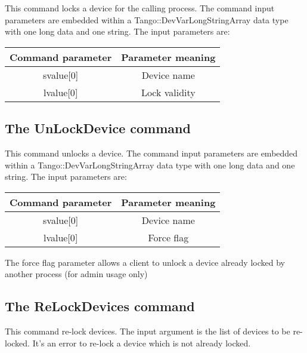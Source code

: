 This command locks a device for the calling process. The command input
parameters are embedded within a Tango::DevVarLongStringArray data
type with one long data and one string. The input parameters are:\vspace{0.3cm}

\begin{center}
\begin{longtable}{|c|c|}
\hline 
Command parameter & Parameter meaning\tabularnewline
\hline 
\hline 
svalue{[}0{]} & Device name\tabularnewline
\hline 
lvalue{[}0{]} & Lock validity\tabularnewline
\hline 
\end{longtable}
\par\end{center}

\vspace{0.3cm}


\subsection{The UnLockDevice command}

This command unlocks a device. The command input parameters are embedded
within a Tango::DevVarLongStringArray data type with one long data
and one string. The input parameters are:\vspace{0.3cm}

\begin{center}
\begin{longtable}{|c|c|}
\hline 
Command parameter & Parameter meaning\tabularnewline
\hline 
\hline 
svalue{[}0{]} & Device name\tabularnewline
\hline 
lvalue{[}0{]} & Force flag\tabularnewline
\hline 
\end{longtable}
\par\end{center}

\vspace{0.3cm}

The force flag parameter allows a client to unlock a device already
locked by another process (for admin usage only)

\subsection{The ReLockDevices command}

This command re-lock devices. The input argument is the list of devices
to be re-locked. It's an error to re-lock a device which is not already
locked.

